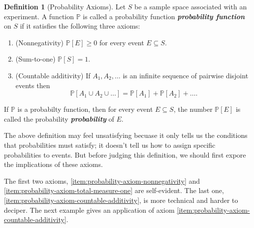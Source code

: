 \documentclass[10pt]{article}
\theoremstyle{definition}
\newtheorem{definition}[theorem]{Definition}
\newcommand{\1}[1]{\textbf{1}_{\left[#1\right]}} %
\def\P{\mathbb{P}} %
\DeclareRobustCommand{\demph}[1]{%
  \ifmmode
  {\color{Blue}#1}%
  \else
  {\color{Blue}\bfseries\slshape #1}%
  \fi
}
\begin{document}
\begin{definition}[Probability Axioms]
  \label{def:probability-measure}
  Let $S$ be a sample space associated with an experiment. A function $\P$ is
  called a \demph{probability function} on $S$ if it satisfies the following three
  axioms:
  \begin{enumerate}[label=\textbf{A.\arabic*}]
    \item (Nonnegativity) \label{item:probability-axiom-nonnegativity}
    $\P\left[E\right] \geq 0$ for every event $E\subseteq S$.
    \item (Sum-to-one) \label{item:probability-axiom-total-measure-one} $\P\left[S \right] =1$.
    \item (Countable
    additivity) \label{item:probability-axiom-countable-additivity} If
    $A_{1},A_{2},\ldots$ is an infinite sequence of pairwise disjoint events
    then
    \begin{equation*}
      \P\left[A_{1}\cup A_{2}\cup \ldots \right] = \P\left[A_{1} \right]+\P\left[A_{2} \right]+\ldots.
    \end{equation*}
  \end{enumerate}
  If $\P$ is a probabilty function, then for every event
  $E\subseteq S$, the number  $\P[E]$ is called the \demph{probability} of $E$.
\end{definition}

The above definition may feel unsatisfying becuase it only tells us the
conditions that probabilities must satisfy; it doesn't tell us how to assign
specific probabilities to events. But before judging this definition, we
should first expore the implications of these axioms.

The first two axioms, \ref{item:probability-axiom-nonnegativity} and
\ref{item:probability-axiom-total-measure-one} are self-evident. The last one,
\ref{item:probability-axiom-countable-additivity}, is more technical and
harder to deciper. The next example gives an application of axiom
\ref{item:probability-axiom-countable-additivity}.
\end{document}
